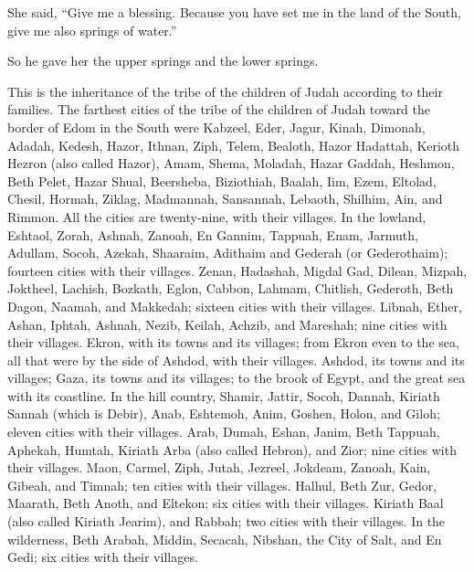  She said, ``Give me a blessing. Because you have set me in
the land of the South, give me also springs of water.''

So he gave her the upper springs and the lower springs.

 This is the inheritance of the tribe of the children of
Judah according to their families.  The farthest cities of
the tribe of the children of Judah toward the border of Edom in the
South were Kabzeel, Eder, Jagur,  Kinah, Dimonah, Adadah,
 Kedesh, Hazor, Ithnan,  Ziph, Telem, Bealoth,
 Hazor Hadattah, Kerioth Hezron (also called Hazor),
 Amam, Shema, Moladah,  Hazar Gaddah, Heshmon,
Beth Pelet,  Hazar Shual, Beersheba, Biziothiah,
 Baalah, Iim, Ezem,  Eltolad, Chesil, Hormah,
 Ziklag, Madmannah, Sansannah,  Lebaoth,
Shilhim, Ain, and Rimmon. All the cities are twenty-nine, with their
villages.  In the lowland, Eshtaol, Zorah, Ashnah,
 Zanoah, En Gannim, Tappuah, Enam,  Jarmuth,
Adullam, Socoh, Azekah,  Shaaraim, Adithaim and Gederah (or
Gederothaim); fourteen cities with their villages.  Zenan,
Hadashah, Migdal Gad,  Dilean, Mizpah, Joktheel,
 Lachish, Bozkath, Eglon,  Cabbon, Lahmam,
Chitlish,  Gederoth, Beth Dagon, Naamah, and Makkedah;
sixteen cities with their villages.  Libnah, Ether, Ashan,
 Iphtah, Ashnah, Nezib,  Keilah, Achzib, and
Mareshah; nine cities with their villages.  Ekron, with its
towns and its villages;  from Ekron even to the sea, all
that were by the side of Ashdod, with their villages. 
Ashdod, its towns and its villages; Gaza, its towns and its villages; to
the brook of Egypt, and the great sea with its coastline. 
In the hill country, Shamir, Jattir, Socoh,  Dannah,
Kiriath Sannah (which is Debir),  Anab, Eshtemoh, Anim,
 Goshen, Holon, and Giloh; eleven cities with their
villages.  Arab, Dumah, Eshan,  Janim, Beth
Tappuah, Aphekah,  Humtah, Kiriath Arba (also called
Hebron), and Zior; nine cities with their villages.  Maon,
Carmel, Ziph, Jutah,  Jezreel, Jokdeam, Zanoah,
 Kain, Gibeah, and Timnah; ten cities with their villages.
 Halhul, Beth Zur, Gedor,  Maarath, Beth
Anoth, and Eltekon; six cities with their villages. 
Kiriath Baal (also called Kiriath Jearim), and Rabbah; two cities with
their villages.  In the wilderness, Beth Arabah, Middin,
Secacah,  Nibshan, the City of Salt, and En Gedi; six
cities with their villages.

